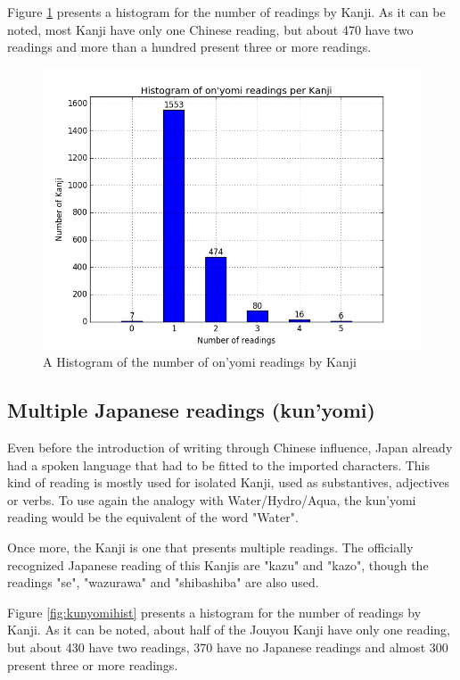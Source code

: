 Figure \ref{fig:onyomihist} presents a histogram for the number of readings by Kanji. As it can be noted, most Kanji have only one Chinese reading, but about 470 have two readings and more than a hundred present three or more readings.

\begin{figure}[ht]
    \centering
    \includegraphics[width=\textwidth]{Cap1/HistogramOnYomi}
    \caption{A Histogram of the number of on'yomi readings by Kanji}
    \label{fig:onyomihist}
\end{figure}

\clearpage

\subsection{Multiple Japanese readings (kun'yomi)}

Even before the introduction of writing through Chinese influence, Japan already had a spoken language that had to be fitted to the imported characters. This kind of reading is mostly used for isolated Kanji, used as substantives, adjectives or verbs. To use again the analogy with Water/Hydro/Aqua, the kun'yomi reading would be the equivalent of the word "Water".

Once more, the Kanji  is one that presents multiple readings. The officially recognized Japanese reading of this Kanjis are "kazu" and "kazo", though the readings "se", "wazurawa" and "shibashiba" are also used.

Figure \ref{fig:kunyomihist} presents a histogram for the number of readings by Kanji. As it can be noted, about half of the Jouyou Kanji have only one reading, but about 430 have two readings, 370 have no Japanese readings and almost 300 present three or more readings.

